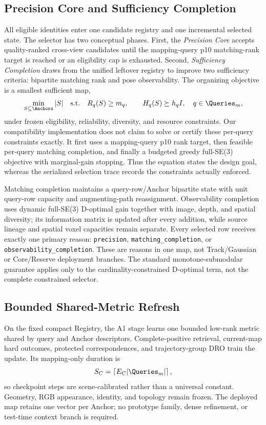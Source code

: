 \subsection{Precision Core and Sufficiency Completion}

All eligible identities enter one candidate registry and one incremental
selected state. The selector has two conceptual phases. First, the
\emph{Precision Core} accepts quality-ranked cross-view candidates until the
mapping-query p10 matching-rank target is reached or an eligibility cap is
exhausted. Second, \emph{Sufficiency Completion} draws from the unified
leftover registry to improve two sufficiency criteria: bipartite matching rank
and pose observability. The organizing objective is a smallest sufficient map,
\begin{equation}
 \min_{S\subseteq\Anchors}|S|\quad\text{s.t.}\quad
 R_q(S)\ge m_q,\qquad H_q(S)\succeq h_q I,
 \quad q\in\Queries_m,
\end{equation}
under frozen eligibility, reliability, diversity, and resource constraints.
Our compatibility implementation does not claim to solve or certify these
per-query constraints exactly. It first uses a mapping-query p10 rank target,
then feasible per-query matching completion, and finally a budgeted greedy
full-SE(3) objective with marginal-gain stopping. Thus the equation states the
design goal, whereas the serialized selection trace records the constraints
actually enforced.

Matching completion maintains a query-row/Anchor bipartite state with unit
query-row capacity and augmenting-path reassignment. Observability completion
uses dynamic full-SE(3) D-optimal gain together with image, depth, and spatial
diversity; its information matrix is updated after every addition, while
source lineage and spatial voxel capacities remain separate. Every selected
row receives exactly one primary reason: \texttt{precision},
\texttt{matching\_completion}, or \texttt{observability\_completion}. These are
reasons in one map, not Track/Gaussian or Core/Reserve deployment branches. The
standard monotone-submodular guarantee applies only to the
cardinality-constrained D-optimal term, not the complete constrained selector.

\subsection{Bounded Shared-Metric Refresh}

On the fixed compact Registry, the A1 stage learns one bounded low-rank metric
shared by query and Anchor descriptors. Complete-positive retrieval,
current-map hard outcomes, protected correspondences, and trajectory-group DRO
train the update. Its mapping-only duration is
\begin{equation}
  S_C=\left\lceil E_C|\Queries_m|\right\rceil,
\end{equation}
so checkpoint steps are scene-calibrated rather than a universal constant.
Geometry, RGB appearance, identity, and topology remain frozen. The deployed
map retains one vector per Anchor; no prototype family, dense refinement, or
test-time context branch is required.

